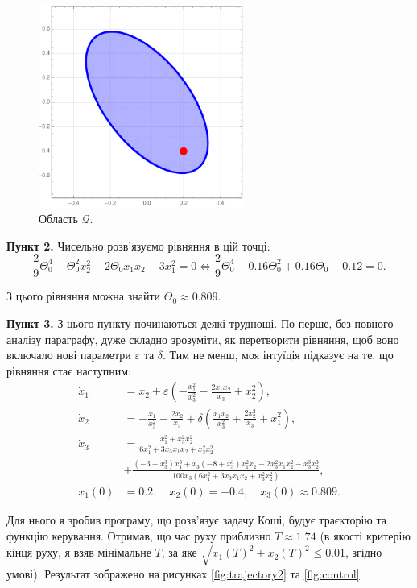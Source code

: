 \documentclass{hw_template}
\begin{document}
\begin{figure}[H]
    \centering
    \includegraphics[width=0.6\textwidth]{figures/q.pdf}
    \caption{Область $\mathcal{Q}$.}
    \label{fig:region}
\end{figure}

\textbf{Пункт 2.} Чисельно розв'язуємо рівняння в цій точці:
\begin{equation*}
    \frac{2}{9}\Theta_0^4 - \Theta_0^2x_2^2 - 2\Theta_0 x_1x_2 - 3x_1^2 = 0 \iff \frac{2}{9}\Theta_0^4 - 0.16\Theta_0^2 + 0.16\Theta_0 - 0.12 = 0.
\end{equation*}

З цього рівняння можна знайти $\Theta_0 \approx 0.809$.

\textbf{Пункт 3.} З цього пункту починаються деякі труднощі. По-перше, без повного
аналізу параграфу, дуже складно зрозуміти, як перетворити рівняння, щоб воно 
включало нові параметри $\varepsilon$ та $\delta$. Тим не менш, моя інтуїція 
підказує на те, що рівняння стає наступним:
\begin{align*}
    \dot{x}_1 &= x_2 + \varepsilon\left(-\frac{x_1^2}{x_3^2}-\frac{2x_1x_2}{x_3}+x_2^2\right),\\
    \dot{x}_2 &= -\frac{x_1}{x_3^2}-\frac{2x_2}{x_3}+\delta\left(\frac{x_1x_2}{x_3^2}+\frac{2x_2^2}{x_3}+x_1^2\right),\\
    \dot{x}_3 &= \frac{x_1^2+x_3^2x_2^2}{6x_1^2+3x_3x_1x_2+x_3^2x_2^2} \\
    &+ \frac{(-3+x_3^3)x_1^3+x_3(-8+x_3^3)x_1^2x_2 - 2x_3^2x_1x_2^2-x_3^3x_2^3}{100x_3(6x_1^2+3x_3x_1x_2+x_3^2x_2^2)}, \\
    x_1(0) &= 0.2, \quad x_2(0) = -0.4, \quad x_3(0) \approx 0.809.
\end{align*}

Для нього я зробив програму, що розв'язує задачу Коші, будує траєкторію та функцію
керування. Отримав, що час руху приблизно $T\approx 1.74$ (в якості критерію
кінця руху, я взяв мінімальне $T$, за яке $\sqrt{x_1(T)^2+x_2(T)^2}\leq 0.01$,
згідно умові). Результат зображено на рисунках \ref{fig:trajectory2} та
\ref{fig:control}.
\end{document}
